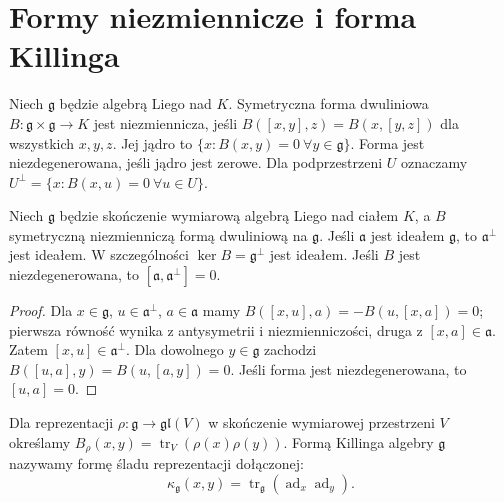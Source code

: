 \section{Formy niezmiennicze i forma Killinga}

\begin{definicja}
\label{aa:def:invariant-lie-form}
Niech $\mathfrak g$ będzie algebrą Liego nad $K$.
Symetryczna forma dwuliniowa $B:\mathfrak g\times
\mathfrak g\to K$ jest niezmiennicza, jeśli
$B([x,y],z)=B(x,[y,z])$ dla wszystkich $x,y,z$.
Jej jądro to $\{x:B(x,y)=0\ \forall y\in\mathfrak g\}$.
Forma jest niezdegenerowana, jeśli jądro jest zerowe.
Dla podprzestrzeni $U$ oznaczamy
$U^\perp=\{x:B(x,u)=0\ \forall u\in U\}$.
\end{definicja}

\begin{lemat}
\label{aa:lem:lie-orthogonal-ideals}
Niech $\mathfrak g$ będzie skończenie wymiarową
algebrą Liego nad ciałem $K$, a $B$ symetryczną
niezmienniczą formą dwuliniową na $\mathfrak g$.
Jeśli $\mathfrak a$ jest ideałem $\mathfrak g$,
to $\mathfrak a^\perp$ jest ideałem.
W szczególności $\ker B=\mathfrak g^\perp$ jest ideałem.
Jeśli $B$ jest niezdegenerowana, to
$[\mathfrak a,\mathfrak a^\perp]=0$.
\end{lemat}
\begin{proof}
Dla $x\in\mathfrak g$, $u\in\mathfrak a^\perp$,
$a\in\mathfrak a$ mamy
$B([x,u],a)=-B(u,[x,a])=0$; pierwsza równość
wynika z antysymetrii i niezmienniczości,
druga z $[x,a]\in\mathfrak a$.
Zatem $[x,u]\in\mathfrak a^\perp$.
Dla dowolnego $y\in\mathfrak g$ zachodzi
$B([u,a],y)=B(u,[a,y])=0$.
Jeśli forma jest niezdegenerowana, to $[u,a]=0$.
\end{proof}

\begin{definicja}
\label{aa:def:killing}
Dla reprezentacji $\rho:\mathfrak g\to\mathfrak{gl}(V)$
w skończenie wymiarowej przestrzeni $V$ określamy
$B_\rho(x,y)=\operatorname{tr}_V(\rho(x)\rho(y))$.
Formą Killinga algebry $\mathfrak g$ nazywamy
formę śladu reprezentacji dołączonej:
\[
 \kappa_{\mathfrak g}(x,y)=
 \operatorname{tr}_{\mathfrak g}(\operatorname{ad}_x
 \operatorname{ad}_y).
\]
\end{definicja}

